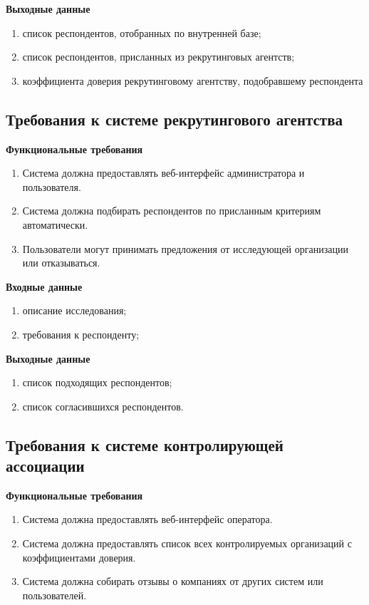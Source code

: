 \textbf{Выходные данные}
\begin{enumerate}
\item список респондентов, отобранных по внутренней базе;
\item список респондентов, присланных из рекрутинговых агентств;
\item коэффициента доверия рекрутинговому агентству, подобравшему респондента
\end{enumerate}

\subsection{Требования к системе рекрутингового агентства}

\textbf{Функциональные требования}
\begin{enumerate}
\item Система должна предоставлять веб-интерфейс администратора и пользователя.
\item Система должна подбирать респондентов по присланным критериям автоматически.
\item Пользователи могут принимать предложения от исследующей организации или отказываться.
\end{enumerate}

\textbf{Входные данные}
\begin{enumerate}
\item описание исследования;
\item требования к респонденту;
\end{enumerate}

\textbf{Выходные данные}
\begin{enumerate}
\item список подходящих респондентов;
\item список согласившихся респондентов.
\end{enumerate}

\subsection{Требования к системе контролирующей ассоциации}

\textbf{Функциональные требования}
\begin{enumerate}
\item Система должна предоставлять веб-интерфейс оператора.
\item Система должна предоставлять список всех контролируемых организаций с коэффициентами доверия.
\item Система должна собирать отзывы о компаниях от других систем или пользователей.
\end{enumerate}

